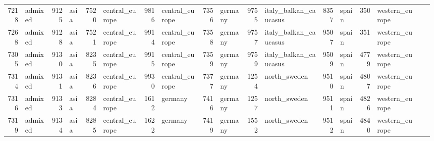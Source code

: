 \begin{table}[h]
{\begin{tabular}{rl|rl|rl|rl|rl|rl|rl|rl|rl}
			7218                   & admixed         & 9125                   & asia            & 7520                   & central\_europe & 9816                   & central\_europe & 7356                   & germany                 & 9755                   & italy\_balkan\_caucasus & 8357                   & spain           & 350                    & western\_europe &                          &                 \\
			7268                   & admixed         & 9128                   & asia            & 7521                   & central\_europe & 9914                   & central\_europe & 7358                   & germany                 & 9757                   & italy\_balkan\_caucasus & 9507                   & spain           & 351                    & western\_europe &                          &                 \\
			7305                   & admixed         & 9130                   & asia            & 8235                   & central\_europe & 9915                   & central\_europe & 7359                   & germany                 & 9759                   & italy\_balkan\_caucasus & 9509                   & spain           & 4779                   & western\_europe &                          &                 \\
			7314                   & admixed         & 9131                   & asia            & 8236                   & central\_europe & 9930                   & central\_europe & 7377                   & germany                 & 1254                   & north\_sweden           & 9510                   & spain           & 4807                   & western\_europe &                          &                 \\
			7316                   & admixed         & 9133                   & asia            & 8284                   & central\_europe & 1612                   & germany         & 7416                   & germany                 & 1257                   & north\_sweden           & 9511                   & spain           & 4826                   & western\_europe &                          &                 \\
			7319                   & admixed         & 9134                   & asia            & 8285                   & central\_europe & 1622                   & germany         & 7419                   & germany                 & 1552                   & north\_sweden           & 9512                   & spain           & 4840                   & western\_europe &                          &                 \\

\end{tabular}}
\end{table}
